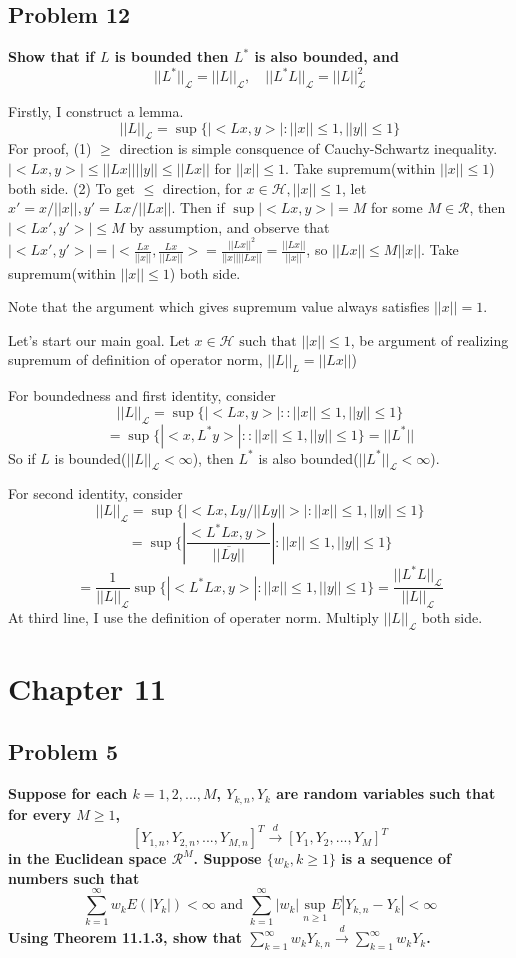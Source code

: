 \documentclass{article}
\begin{document}
\subsection{Problem 12}
\textbf{
    Show that if $L$ is bounded then $L^*$ is also bounded, and
    \[||L^*||_{\mathcal{L}}=||L||_{\mathcal{L}}, \quad  
    ||L^*L||_{\mathcal{L}}=||L||^2_{\mathcal{L}}
    \]
}

Firstly, I construct a lemma.
\[||L||_{\mathcal{L}} = \sup\{|<Lx,y>|:||x||\leq 1, ||y||\leq 1\}\]
For proof, (1) $\geq$ direction is simple consquence of Cauchy-Schwartz inequality.
\(|<Lx,y>|\leq ||Lx||||y|| \leq ||Lx||\) for $||x||\leq 1$. Take supremum(within $||x||\leq 1$) both side.
(2) To get $\leq$ direction, for $x\in \mathcal{H}, ||x||\leq 1$,
let $x'=x/||x||, y'=Lx/||Lx||$. Then if $\sup|<Lx,y>|= M$ for some $M\in\mathcal{R}$, then $|<Lx',y'>|\leq M$ by assumption, and observe that
\(|<Lx',y'>|=|<\frac{Lx}{||x||},\frac{Lx}{||Lx||}>=\frac{||Lx||^2}{||x||||Lx||}=\frac{||Lx||}{||x||}\), so
$||Lx||\leq M||x||$. Take supremum(within $||x||\leq 1$) both side.

Note that the argument which gives supremum value always satisfies $||x||=1$.

Let's start our main goal.
Let $x\in \mathcal{H} \text{ such that } ||x||\leq 1$, be argument of realizing supremum of definition of operator norm, \(||L||_{L}=||Lx||\))

For boundedness and first identity, consider
\[||L||_\mathcal{{L}}=\sup\{|<Lx, y>| : :||x||\leq 1, ||y||\leq 1\}\]
\[=\sup\{|<x, L^*y>| : :||x||\leq 1, ||y||\leq 1\} = ||L^*||\]
So if $L$ is bounded($||L||_\mathcal{L}<\infty$), then $L^*$ is also bounded($||L^*||_\mathcal{L}<\infty$).

For second identity, consider
\[||L||_\mathcal{{L}}=\sup\{|<Lx, Ly/||Ly||>| :||x||\leq 1, ||y||\leq 1\}\]
\[=\sup\{|\frac{<L^*Lx, y>}{\overline{||Ly||}}| : ||x||\leq 1, ||y||\leq 1\}\]
\[=\frac{1}{||L||_{\mathcal{L}}}\sup\{|<L^*Lx, y>| : ||x||\leq 1, ||y||\leq 1\}=\frac{||L^*L||_{\mathcal{L}}}{||L||_{\mathcal{L}}}\]
At third line, I use the definition of operater norm. Multiply $||L||_{\mathcal{L}}$ both side.

\section{Chapter 11}
\subsection{Problem 5}
\textbf{
    Suppose for each $k=1,2,...,M$, $Y_{k,n}, Y_k$ are random variables such that for every $M\geq 1$,
    \[ [Y_{1,n},Y_{2,n},...,Y_{M,n}]^T\xrightarrow{d} [Y_1,Y_2,...,Y_M]^T\]
    in the Euclidean space $\mathcal{R}^M$. Suppose $\{w_k, k\geq 1\}$ is a sequence of numbers such that
    \[\sum_{k=1}^{\infty}w_k E(|Y_k|)<\infty \text{ and } \sum_{k=1}^{\infty}|w_k|\sup_{n\geq 1}E|Y_{k,n}-Y_k|<\infty\]
    Using Theorem 11.1.3, show that \(\sum_{k=1}^{\infty}w_kY_{k,n}\xrightarrow{d}\sum_{k=1}^{\infty}w_kY_k\).
}
\end{document}

